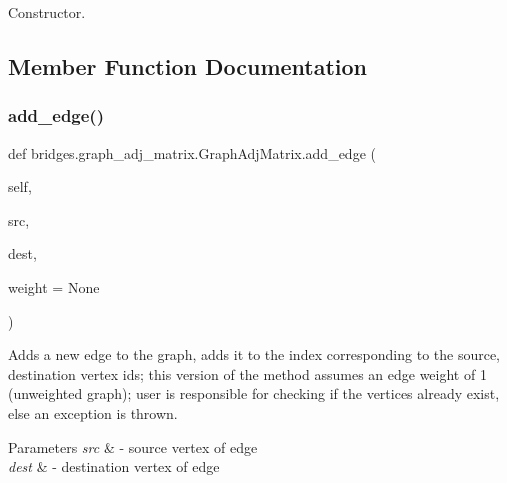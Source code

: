 Constructor. 



\subsection{Member Function Documentation}
\mbox{\label{classbridges_1_1graph__adj__matrix_1_1_graph_adj_matrix_aad67dc7b3da58ff67fd807a3455765c1}} 
\subsubsection{\texorpdfstring{add\+\_\+edge()}{add\_edge()}}
{\footnotesize\ttfamily def bridges.\+graph\+\_\+adj\+\_\+matrix.\+Graph\+Adj\+Matrix.\+add\+\_\+edge (\begin{DoxyParamCaption}\item[{}]{self,  }\item[{}]{src,  }\item[{}]{dest,  }\item[{}]{weight = {\ttfamily None} }\end{DoxyParamCaption})}



Adds a new edge to the graph, adds it to the index corresponding to the source, destination vertex ids; this version of the method assumes an edge weight of 1 (unweighted graph); user is responsible for checking if the vertices already exist, else an exception is thrown. 


\begin{DoxyParams}{Parameters}
{\em src} & -\/ source vertex of edge \\
\hline
{\em dest} & -\/ destination vertex of edge \\
\hline
\end{DoxyParams}
\mbox{\label{classbridges_1_1graph__adj__matrix_1_1_graph_adj_matrix_aa6fa31ebae643950dd33628269136d00}} 
